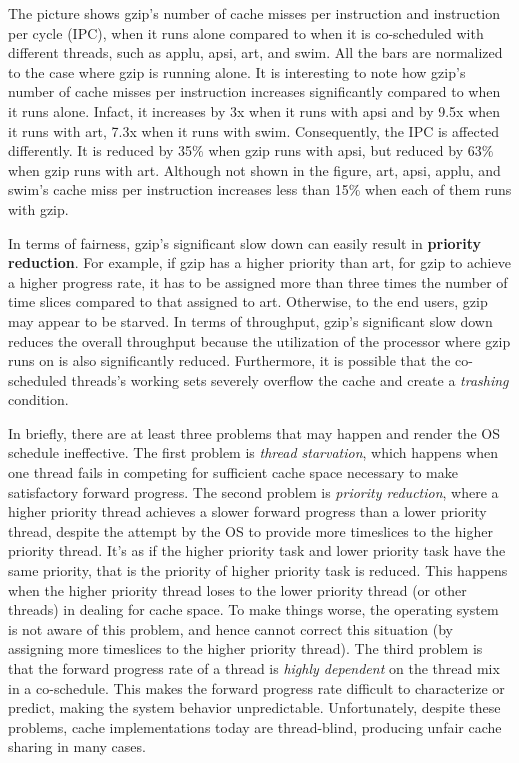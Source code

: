 The picture shows gzip's number of cache misses per instruction and instruction per cycle (IPC), when it runs alone compared to when it is
co-scheduled with different threads, such as applu, apsi, art, and swim. All the bars are normalized to the case where gzip is running alone.
It is interesting to note how gzip's number of cache misses per instruction increases significantly compared to when it runs alone. Infact, it increases 
by 3x when it runs with apsi and by 9.5x when it runs with art, 7.3x when it runs with swim.
Consequently, the IPC is affected differently. It is reduced by 35$\%$ when gzip runs with apsi, but reduced by 63$\%$ when gzip runs with art. 
Although not shown in the figure, art, apsi, applu, and swim's cache miss per instruction increases less than 15$\%$ when each of them runs with gzip. 

In terms of fairness, gzip's significant slow down can easily result in \textbf{priority reduction}. 
For example, if gzip has a higher priority than art, for gzip to achieve a higher progress rate, it has to be assigned more than three times the 
number of time slices compared to that assigned to art. Otherwise, to the end users, gzip may appear to be starved. In terms of throughput,
gzip's significant slow down reduces the overall throughput because the utilization of the processor where gzip runs on is also significantly reduced. 
Furthermore, it is possible that the co-scheduled threads's working sets severely overflow the cache and create a \textit{trashing} condition.

In briefly, there are at least three problems that may happen and render the OS schedule ineffective.
The first problem is \textit{thread starvation}, which happens when one thread fails in competing for sufficient cache space necessary to make 
satisfactory forward progress. The second problem is \textit{priority reduction}, where a higher priority thread achieves a slower forward
progress than a lower priority thread, despite the attempt by the OS to provide more timeslices to the higher priority thread. It's as if the higher 
priority task and lower priority task have the same priority, that is the priority of higher priority task is reduced.
This happens when the higher priority thread loses to the lower priority thread (or other threads) in dealing for cache space. 
To make things worse, the operating system is not aware of this problem, and hence cannot correct this situation (by assigning more timeslices to the 
higher priority thread). The third problem is that the forward progress rate of a thread is \textit{highly dependent} on the thread mix in a co-schedule. 
This makes the forward progress rate difficult to characterize or predict, making the system behavior unpredictable. Unfortunately, despite these problems, 
cache implementations today are thread-blind, producing unfair cache sharing in many cases.

